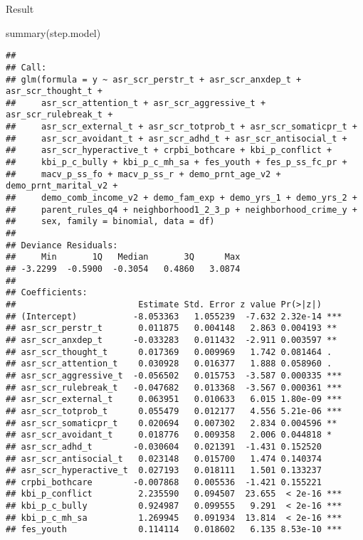 \documentclass[
]{article}
\newenvironment{Shaded}{\begin{snugshade}}{\end{snugshade}}
\newcommand{\FunctionTok}[1]{\textcolor[rgb]{0.00,0.00,0.00}{#1}}
\newcommand{\NormalTok}[1]{#1}
\begin{document}
Result

\begin{Shaded}
\begin{Highlighting}[]
\FunctionTok{summary}\NormalTok{(step.model)}
\end{Highlighting}
\end{Shaded}

\begin{verbatim}
## 
## Call:
## glm(formula = y ~ asr_scr_perstr_t + asr_scr_anxdep_t + asr_scr_thought_t + 
##     asr_scr_attention_t + asr_scr_aggressive_t + asr_scr_rulebreak_t + 
##     asr_scr_external_t + asr_scr_totprob_t + asr_scr_somaticpr_t + 
##     asr_scr_avoidant_t + asr_scr_adhd_t + asr_scr_antisocial_t + 
##     asr_scr_hyperactive_t + crpbi_bothcare + kbi_p_conflict + 
##     kbi_p_c_bully + kbi_p_c_mh_sa + fes_youth + fes_p_ss_fc_pr + 
##     macv_p_ss_fo + macv_p_ss_r + demo_prnt_age_v2 + demo_prnt_marital_v2 + 
##     demo_comb_income_v2 + demo_fam_exp + demo_yrs_1 + demo_yrs_2 + 
##     parent_rules_q4 + neighborhood1_2_3_p + neighborhood_crime_y + 
##     sex, family = binomial, data = df)
## 
## Deviance Residuals: 
##     Min       1Q   Median       3Q      Max  
## -3.2299  -0.5900  -0.3054   0.4860   3.0874  
## 
## Coefficients:
##                        Estimate Std. Error z value Pr(>|z|)    
## (Intercept)           -8.053363   1.055239  -7.632 2.32e-14 ***
## asr_scr_perstr_t       0.011875   0.004148   2.863 0.004193 ** 
## asr_scr_anxdep_t      -0.033283   0.011432  -2.911 0.003597 ** 
## asr_scr_thought_t      0.017369   0.009969   1.742 0.081464 .  
## asr_scr_attention_t    0.030928   0.016377   1.888 0.058960 .  
## asr_scr_aggressive_t  -0.056502   0.015753  -3.587 0.000335 ***
## asr_scr_rulebreak_t   -0.047682   0.013368  -3.567 0.000361 ***
## asr_scr_external_t     0.063951   0.010633   6.015 1.80e-09 ***
## asr_scr_totprob_t      0.055479   0.012177   4.556 5.21e-06 ***
## asr_scr_somaticpr_t    0.020694   0.007302   2.834 0.004596 ** 
## asr_scr_avoidant_t     0.018776   0.009358   2.006 0.044818 *  
## asr_scr_adhd_t        -0.030604   0.021391  -1.431 0.152520    
## asr_scr_antisocial_t   0.023148   0.015700   1.474 0.140374    
## asr_scr_hyperactive_t  0.027193   0.018111   1.501 0.133237    
## crpbi_bothcare        -0.007868   0.005536  -1.421 0.155221    
## kbi_p_conflict         2.235590   0.094507  23.655  < 2e-16 ***
## kbi_p_c_bully          0.924987   0.099555   9.291  < 2e-16 ***
## kbi_p_c_mh_sa          1.269945   0.091934  13.814  < 2e-16 ***
## fes_youth              0.114114   0.018602   6.135 8.53e-10 ***

\end{verbatim}
\end{document}
